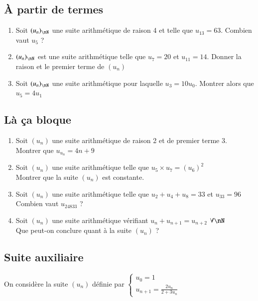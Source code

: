 \documentclass[oneside,12pt]{article}          %
\begin{document}
\subsection{À partir de termes}
\begin{enumerate}
    \item Soit $(u_n)_{\nN}$ une suite arithmétique de raison 4 et telle que $u_{13}=63$. Combien vaut $u_{5}$ ? 
    \item $(u_n)_{\nN}$ est une suite arithmétique telle que $u_{7}=20$ et $u_{11}=14$. Donner la raison et le premier terme de $(u_n)$
	\item Soit $(u_n)_{\nN}$ une suite arithmétique pour laquelle $u_3=10u_0$. Montrer alors que $u_5=4u_1$
\end{enumerate}



\subsection{Là ça bloque}
\begin{enumerate}
	\item Soit $(u_n)$ une suite arithmétique de raison 2 et de premier terme 3.\\
	Montrer que $u_{u_n}=4n+9$
	\item Soit $(u_n)$ une suite arithmétique telle que $u_5\times u_7=(u_6)^2$\\
	Montrer que la suite $(u_n)$ est constante.
	\item Soit $(u_n)$ une suite arithmétique telle que $u_2+u_4+u_8=33$ et $u_{33}=96$\\
	Combien vaut $u_{24833}$ ?
	\item Soit $(u_n)$ une suite arithmétique vérifiant $u_n+u_{n+1}=u_{n+2}$ \quad $\forall\nN$\\
	Que peut-on conclure quant à la suite $(u_n)$ ?
\end{enumerate}



\subsection{Suite auxiliaire}
On considère la suite $(u_n)$ définie par $\begin{cases}u_{0}=1\\u_{n+1}=\frac{2u_n}{2+3u_n}\end{cases}$
\end{document}
